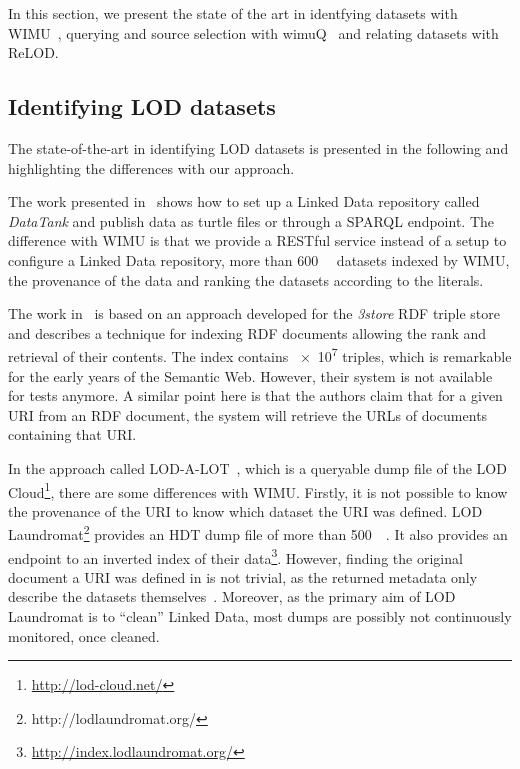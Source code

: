 \documentclass[sw]{iosart2x}
\begin{document}
In this section, we present the state of the art in identfying datasets with WIMU~\cite{valdestilhas2018my}, querying and source selection with wimuQ~\cite{valdestilhas2019more} and relating datasets with ReLOD.

\subsection{Identifying LOD datasets}
The state-of-the-art in identifying LOD datasets is presented in the following and highlighting the differences with our approach.

The work presented in~\cite{colpaert2014painless} shows how to set up a Linked Data repository called \emph{DataTank} and publish data as turtle files or through a SPARQL endpoint.
The difference with WIMU is that we provide a RESTful service instead of a setup to configure a Linked Data repository{\color{blue}, more than \SI{600}{\kilo\nothing} datasets indexed by WIMU, the provenance of the data and ranking the datasets according to the literals}.

The work in~\cite{harris2004semindex} is based on an approach developed for the \emph{3store} RDF triple store and describes a technique for indexing RDF documents allowing the rank and retrieval of their contents.
The index contains \num{e7} triples, which is remarkable for the early years of the Semantic Web.
However, their system is not available for tests anymore.
A similar point here is that the authors claim that for a given URI from an RDF document, the system will retrieve the URLs of documents containing that URI.

In the approach called LOD-A-LOT~\cite{fernandez2017lod}, which is a queryable dump file of the LOD Cloud\footnote{\url{http://lod-cloud.net/}}, there are some differences with WIMU.
Firstly, it is not possible to know the provenance of the URI to know which dataset the URI was defined.
LOD Laundromat\footnote{http://lodlaundromat.org/} provides an HDT dump file of more than \SI{500}{\gibi\byte}.
It also provides an endpoint to an inverted index of their data\footnote{\url{http://index.lodlaundromat.org/}}.
However, finding the original document a URI was defined in is not trivial, as the returned metadata only describe the datasets themselves~\cite{beek2014lod}.
Moreover, as the primary aim of LOD Laundromat is to \enquote{clean} Linked Data, most dumps are possibly not continuously monitored, once cleaned.
\end{document}
